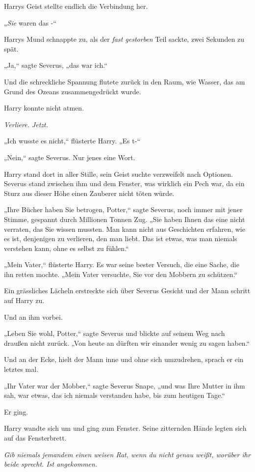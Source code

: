 {Harrys Geist stellte endlich die Verbindung her.

„\emph{Sie} waren das -“

Harrys Mund schnappte zu, als der \emph{fast gestorben} Teil sackte, zwei Sekunden zu spät.

„Ja,“ sagte Severus, „das war ich.“

Und die schreckliche Spannung flutete zurück in den Raum, wie Wasser, das am Grund des Ozeans zusammengedrückt wurde.

Harry konnte nicht atmen.

\emph{Verliere. Jetzt.}

„Ich wusste es nicht,“ flüsterte Harry. „Es t-“

„Nein,“ sagte Severus. Nur jenes eine Wort.

Harry stand dort in aller Stille, sein Geist suchte verzweifelt nach Optionen. Severus stand zwischen ihm und dem Fenster, was wirklich ein Pech war, da ein Sturz aus dieser Höhe einen Zauberer nicht töten würde.

„Ihre Bücher haben Sie betrogen, Potter,“ sagte Severus, noch immer mit jener Stimme, gespannt durch Millionen Tonnen Zug. „Sie haben Ihnen das eine nicht verraten, das Sie wissen mussten. Man kann nicht aus Geschichten erfahren, wie es ist, denjenigen zu verlieren, den man liebt. Das ist etwas, was man niemals verstehen kann, ohne es selbst zu fühlen.“

„Mein Vater,“ flüsterte Harry. Es war seine bester Versuch, die eine Sache, die ihn retten mochte. „Mein Vater versuchte, Sie vor den Mobbern zu schützen.“

Ein grässliches Lächeln erstreckte sich über Severus Gesicht und der Mann schritt auf Harry zu.

Und an ihm vorbei.

„Leben Sie wohl, Potter,“ sagte Severus und blickte auf seinem Weg nach draußen nicht zurück. „Von heute an dürften wir einander wenig zu sagen haben.“

Und an der Ecke, hielt der Mann inne und ohne sich umzudrehen, sprach er ein letztes mal.

„Ihr Vater war der Mobber,“ sagte Severus Snape, „und was Ihre Mutter in ihm sah, war etwas, das ich niemals verstanden habe, bis zum heutigen Tage.“

Er ging.

Harry wandte sich um und ging zum Fenster. Seine zitternden Hände legten sich auf das Fensterbrett.

\emph{Gib niemals jemandem einen weisen Rat, wenn du nicht genau weißt, worüber ihr beide sprecht. Ist angekommen.}

}
